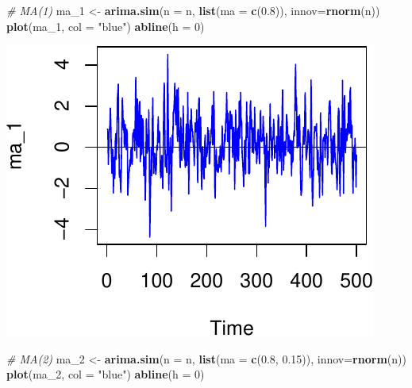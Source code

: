 \documentclass[11pt,]{article}
\newenvironment{Shaded}{\begin{snugshade}}{\end{snugshade}}
\newcommand{\KeywordTok}[1]{\textcolor[rgb]{0.13,0.29,0.53}{\textbf{#1}}}
\newcommand{\DataTypeTok}[1]{\textcolor[rgb]{0.13,0.29,0.53}{#1}}
\newcommand{\DecValTok}[1]{\textcolor[rgb]{0.00,0.00,0.81}{#1}}
\newcommand{\FloatTok}[1]{\textcolor[rgb]{0.00,0.00,0.81}{#1}}
\newcommand{\StringTok}[1]{\textcolor[rgb]{0.31,0.60,0.02}{#1}}
\newcommand{\CommentTok}[1]{\textcolor[rgb]{0.56,0.35,0.01}{\textit{#1}}}
\newcommand{\NormalTok}[1]{#1}
\begin{document}
\begin{Shaded}
\begin{Highlighting}[]
\CommentTok{# MA(1)}
\NormalTok{ma_}\DecValTok{1}\NormalTok{ <-}\StringTok{ }\KeywordTok{arima.sim}\NormalTok{(}\DataTypeTok{n =}\NormalTok{ n, }\KeywordTok{list}\NormalTok{(}\DataTypeTok{ma =} \KeywordTok{c}\NormalTok{(}\FloatTok{0.8}\NormalTok{)), }\DataTypeTok{innov=}\KeywordTok{rnorm}\NormalTok{(n))}
\KeywordTok{plot}\NormalTok{(ma_}\DecValTok{1}\NormalTok{, }\DataTypeTok{col =} \StringTok{"blue"}\NormalTok{)}
\KeywordTok{abline}\NormalTok{(}\DataTypeTok{h =} \DecValTok{0}\NormalTok{)}
\end{Highlighting}
\end{Shaded}

\begin{center}\includegraphics{FMC_T4_PhD_ARMA_GARCH_files/figure-latex/MA-2} \end{center}

\begin{Shaded}
\begin{Highlighting}[]
\CommentTok{# MA(2)}
\NormalTok{ma_}\DecValTok{2}\NormalTok{ <-}\StringTok{ }\KeywordTok{arima.sim}\NormalTok{(}\DataTypeTok{n =}\NormalTok{ n, }\KeywordTok{list}\NormalTok{(}\DataTypeTok{ma =} \KeywordTok{c}\NormalTok{(}\FloatTok{0.8}\NormalTok{, }\FloatTok{0.15}\NormalTok{)), }\DataTypeTok{innov=}\KeywordTok{rnorm}\NormalTok{(n))}
\KeywordTok{plot}\NormalTok{(ma_}\DecValTok{2}\NormalTok{, }\DataTypeTok{col =} \StringTok{"blue"}\NormalTok{)}
\KeywordTok{abline}\NormalTok{(}\DataTypeTok{h =} \DecValTok{0}\NormalTok{)}
\end{Highlighting}
\end{Shaded}
\end{document}
